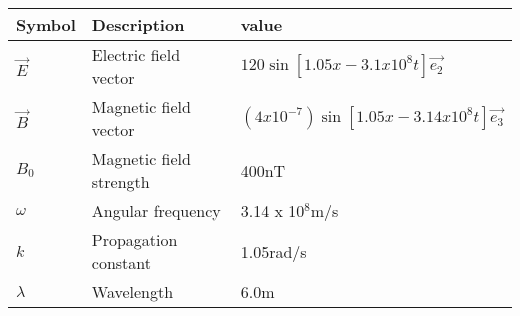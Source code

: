 \setlength{\arrayrulewidth}{0.3mm}
\setlength{\tabcolsep}{15pt}
\renewcommand{\arraystretch}{1.5}

\begin{center}
\begin{tabular}{ |p{0.6cm}|p{2cm}|p{4.40cm}|  }


\hline
Symbol& Description&value\\
\hline
$\vec{E}$ & Electric field vector & $120\sin[1.05x - 3.1 x 10^8t]\vec{e_2}$\\
\hline
$\vec{B}$ & Magnetic field vector & $(4 x 10^{-7})\sin[1.05x - 3.14 x 10^8t]\vec{e_3}$\\
\hline
$B_0$ & Magnetic field strength & 400nT\\
\hline
$\omega$ & Angular frequency & 3.14 x 10$^8$m/s\\
\hline
$k$ &Propagation constant & 1.05rad/s\\
\hline
$\lambda$ & Wavelength & 6.0m\\

\hline
\end{tabular}
\end{center}